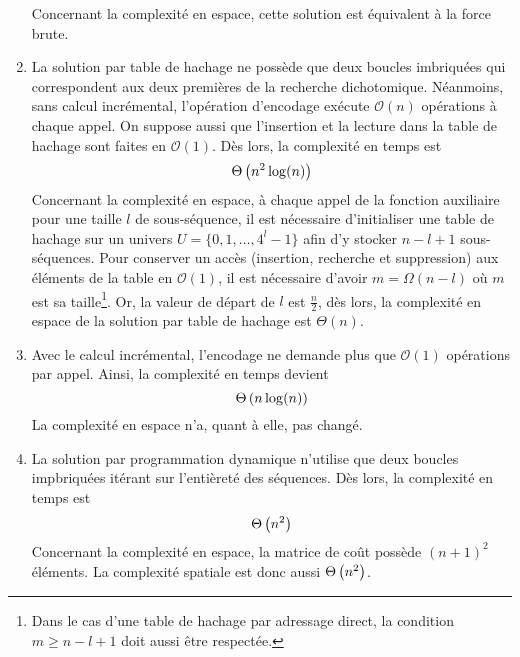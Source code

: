 \documentclass[a4paper, 12pt]{article}
\begin{document}
\begin{enumerate}[label=(\alph*)]
		Concernant la complexité en espace, cette solution est équivalent à la force brute.
		\item La solution par table de hachage ne possède que deux boucles imbriquées qui correspondent aux deux premières de la recherche dichotomique. Néanmoins, sans calcul incrémental, l'opération d'encodage exécute $\mathcal{O}(n)$ opérations à chaque appel. On suppose aussi que l'insertion et la lecture dans la table de hachage sont faites en $\mathcal{O}(1)$. Dès lors, la complexité en temps est
		\begin{equation}
			\Theta\left(n^2 \log(n)\right)
		\end{equation}
		Concernant la complexité en espace, à chaque appel de la fonction auxiliaire pour une taille $l$ de sous-séquence, il est nécessaire d'initialiser une table de hachage sur un univers $U = \{0,1,\ldots,4^l-1\}$ afin d'y stocker $n - l + 1$ sous-séquences. Pour conserver un accès (insertion, recherche et suppression) aux éléments de la table en $\mathcal{O}(1)$, il est nécessaire d'avoir $m = \Omega(n - l)$ où $m$ est sa taille\footnote{Dans le cas d'une table de hachage par adressage direct, la condition $m \geq n - l + 1$ doit aussi être respectée.}. Or, la valeur de départ de $l$ est $\frac{n}{2}$, dès lors, la complexité en espace de la solution par table de hachage est $\Theta(n)$.
		\item Avec le calcul incrémental, l'encodage ne demande plus que $\mathcal{O}(1)$ opérations par appel. Ainsi, la complexité en temps devient
		\begin{equation}
			\Theta\left(n \log(n)\right)
		\end{equation}
		La complexité en espace n'a, quant à elle, pas changé.
		\item La solution par programmation dynamique n'utilise que deux boucles impbriquées itérant sur l'entièreté des séquences. Dès lors, la complexité en temps est
		\begin{equation}
			\Theta\left(n^2\right)
		\end{equation}
		Concernant la complexité en espace, la matrice de coût possède $(n + 1)^2$ éléments. La complexité spatiale est donc aussi $\Theta\left(n^2\right)$.
	\end{enumerate}
	\newpage
\end{document}
